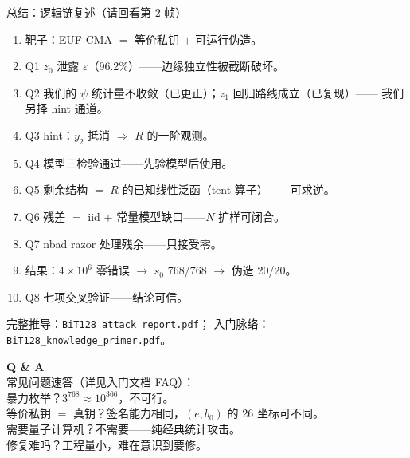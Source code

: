 \documentclass[11pt,aspectratio=169]{ctexbeamer}
\begin{document}
\begin{frame}{总结：逻辑链复述（请回看第 2 帧）}
  \small
  \begin{enumerate}
    \item 靶子：EUF-CMA $=$ 等价私钥 $+$ 可运行伪造。
    \item Q1 $z_0$ 泄露 $\varepsilon$（96.2\%）——边缘独立性被截断破坏。
    \item Q2 我们的 $\psi$ 统计量不收敛（已更正）；$z_1$ 回归路线成立（已复现）——
          我们另择 hint 通道。
    \item Q3 hint：$y_2$ 抵消 $\Rightarrow$ $R$ 的一阶观测。
    \item Q4 模型三检验通过——先验模型后使用。
    \item Q5 剩余结构 $=$ $R$ 的已知线性泛函（tent 算子）——可求逆。
    \item Q6 残差 $=$ iid $+$ 常量模型缺口——$N$ 扩样可闭合。
    \item Q7 nbad razor 处理残余——只接受零。
    \item 结果：$4\times10^6$ 零错误 $\to$ $s_0$ 768/768 $\to$ 伪造 20/20。
    \item Q8 七项交叉验证——结论可信。
  \end{enumerate}
  \begin{center}
    \small 完整推导：\texttt{BiT128\_attack\_report.pdf}；
    入门脉络：\texttt{BiT128\_knowledge\_primer.pdf}。
  \end{center}
\end{frame}

\begin{frame}
  \begin{center}
    \vspace{1.2em}
    {\Large\color{seblue}\textbf{Q \& A}}\\[0.8em]
    {\small 常见问题速答（详见入门文档 FAQ）：\\[0.3em]
    暴力枚举？$3^{768}\approx10^{366}$，不可行。\\
    等价私钥 $=$ 真钥？签名能力相同，$(e,b_0)$ 的 26 坐标可不同。\\
    需要量子计算机？不需要——纯经典统计攻击。\\
    修复难吗？工程量小，难在意识到要修。}
  \end{center}
\end{frame}
\end{document}

